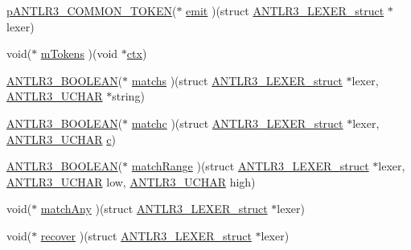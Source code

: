 \begin{DoxyCompactItemize}
\item 
\hyperlink{antlr3interfaces_8h_adaa6df9cbf0cd7ab37fd545520ff299b}{p\-A\-N\-T\-L\-R3\-\_\-\-C\-O\-M\-M\-O\-N\-\_\-\-T\-O\-K\-E\-N}($\ast$ \hyperlink{struct_a_n_t_l_r3___l_e_x_e_r__struct_a5200cf32fbc130ee638ceee2be66bd4d}{emit} )(struct \hyperlink{struct_a_n_t_l_r3___l_e_x_e_r__struct}{A\-N\-T\-L\-R3\-\_\-\-L\-E\-X\-E\-R\-\_\-struct} $\ast$lexer)
\item 
void($\ast$ \hyperlink{struct_a_n_t_l_r3___l_e_x_e_r__struct_af9c91981f78a7d27002934024b024fc0}{m\-Tokens} )(void $\ast$\hyperlink{struct_a_n_t_l_r3___l_e_x_e_r__struct_aa8c9ab64d60b659c71263c2f2a39779a}{ctx})
\item 
\hyperlink{antlr3defs_8h_a5b33dccbba3b7212539695e21df4079b}{A\-N\-T\-L\-R3\-\_\-\-B\-O\-O\-L\-E\-A\-N}($\ast$ \hyperlink{struct_a_n_t_l_r3___l_e_x_e_r__struct_a868ae254b20657e4e8a837bfcf1a4c71}{matchs} )(struct \hyperlink{struct_a_n_t_l_r3___l_e_x_e_r__struct}{A\-N\-T\-L\-R3\-\_\-\-L\-E\-X\-E\-R\-\_\-struct} $\ast$lexer, \hyperlink{antlr3defs_8h_a078eec1343cdbb862af80f352ea701da}{A\-N\-T\-L\-R3\-\_\-\-U\-C\-H\-A\-R} $\ast$string)
\item 
\hyperlink{antlr3defs_8h_a5b33dccbba3b7212539695e21df4079b}{A\-N\-T\-L\-R3\-\_\-\-B\-O\-O\-L\-E\-A\-N}($\ast$ \hyperlink{struct_a_n_t_l_r3___l_e_x_e_r__struct_ae3c5c1856e94f840c9c1872f8617b282}{matchc} )(struct \hyperlink{struct_a_n_t_l_r3___l_e_x_e_r__struct}{A\-N\-T\-L\-R3\-\_\-\-L\-E\-X\-E\-R\-\_\-struct} $\ast$lexer, \hyperlink{antlr3defs_8h_a078eec1343cdbb862af80f352ea701da}{A\-N\-T\-L\-R3\-\_\-\-U\-C\-H\-A\-R} \hyperlink{image_sim_8m_a463b16ca2bfa2f0cbab0e62fcb263d8e}{c})
\item 
\hyperlink{antlr3defs_8h_a5b33dccbba3b7212539695e21df4079b}{A\-N\-T\-L\-R3\-\_\-\-B\-O\-O\-L\-E\-A\-N}($\ast$ \hyperlink{struct_a_n_t_l_r3___l_e_x_e_r__struct_a90cf24b209be2197848b23db2f3fdc06}{match\-Range} )(struct \hyperlink{struct_a_n_t_l_r3___l_e_x_e_r__struct}{A\-N\-T\-L\-R3\-\_\-\-L\-E\-X\-E\-R\-\_\-struct} $\ast$lexer, \hyperlink{antlr3defs_8h_a078eec1343cdbb862af80f352ea701da}{A\-N\-T\-L\-R3\-\_\-\-U\-C\-H\-A\-R} low, \hyperlink{antlr3defs_8h_a078eec1343cdbb862af80f352ea701da}{A\-N\-T\-L\-R3\-\_\-\-U\-C\-H\-A\-R} high)
\item 
void($\ast$ \hyperlink{struct_a_n_t_l_r3___l_e_x_e_r__struct_ade2cead2bc3a6d5693b38e77542f8149}{match\-Any} )(struct \hyperlink{struct_a_n_t_l_r3___l_e_x_e_r__struct}{A\-N\-T\-L\-R3\-\_\-\-L\-E\-X\-E\-R\-\_\-struct} $\ast$lexer)
\item 
void($\ast$ \hyperlink{struct_a_n_t_l_r3___l_e_x_e_r__struct_a77fd0b4598ebb28edab46d9aab6e7143}{recover} )(struct \hyperlink{struct_a_n_t_l_r3___l_e_x_e_r__struct}{A\-N\-T\-L\-R3\-\_\-\-L\-E\-X\-E\-R\-\_\-struct} $\ast$lexer)

\end{DoxyCompactItemize}
